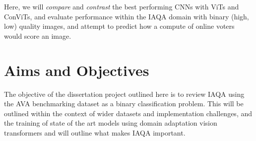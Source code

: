 Here, we will \textit{compare} and \textit{contrast} the best performing CNNs with ViTs and ConViTs, and evaluate performance within the IAQA domain with binary (high, low) quality images, and attempt to predict how a compute of online voters would score an image. 

\section{Aims and Objectives}

\label{aims and objectives} 

The objective of the dissertation project outlined here is to review IAQA using the AVA benchmarking dataset as a binary classification problem. This will be outlined within the context of wider datasets and implementation challenges, and the training of state of the art models using domain adaptation vision transformers and will outline what makes IAQA important.

